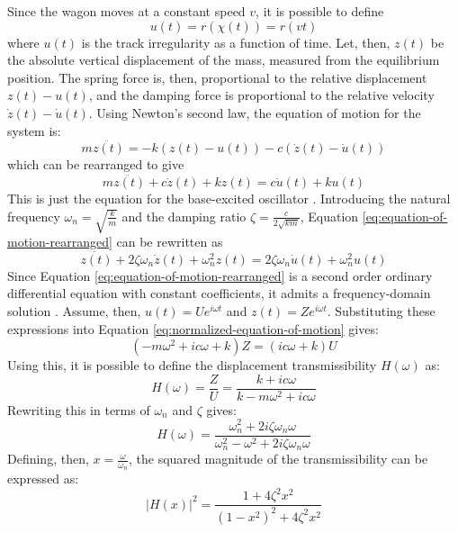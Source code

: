Since the wagon moves at a constant speed $v$, it is possible to define
\begin{equation}
    u(t) = r(\chi (t)) = r(vt)
    \label{eq:spatial-sampling-irregularity}
\end{equation}
where $u(t)$ is the track irregularity as a function of time. Let, then, $z(t)$ be the absolute vertical displacement of the mass, measured from the equilibrium position. The spring force is, then, proportional to the relative displacement $z(t) - u(t)$, and the damping force is proportional to the relative velocity $\dot{z}(t) - \dot{u}(t)$. Using Newton's second law, the equation of motion for the system is:
\begin{equation}
    m \ddot{z (t)} = -k(z(t) - u(t)) - c(\dot{z}(t) - \dot{u}(t))
    \label{eq:equation-of-motion}
\end{equation}
which can be rearranged to give
\begin{equation}
    m \ddot{z (t)} + c \dot{z}(t) + k z(t) = c \dot{u}(t) + k u(t)
    \label{eq:equation-of-motion-rearranged}
\end{equation}
This is just the equation for the base-excited oscillator \cite{newland2005introduction}. Introducing the natural frequency $\omega_n = \sqrt{\frac{k}{m}}$ and the damping ratio $\zeta = \frac{c}{2\sqrt{km}}$, Equation \ref{eq:equation-of-motion-rearranged} can be rewritten as
\begin{equation}
    \ddot{z (t)} + 2 \zeta \omega_n \dot{z}(t) + \omega_n^2 z(t) = 2 \zeta \omega_n \dot{u}(t) + \omega_n^2 u(t)
    \label{eq:normalized-equation-of-motion}
\end{equation}
Since Equation \ref{eq:equation-of-motion-rearranged} is a second order ordinary differential equation with constant coefficients, it admits a frequency-domain solution \cite{peppin1994introduction}. Assume, then, $u(t) = U e^{i \omega t}$ and $z(t) = Z e^{i \omega t}$. Substituting these expressions into Equation \ref{eq:normalized-equation-of-motion} gives:
\begin{equation}
    \left(-m \omega^2 + ic\omega + k\right) Z = \left(ic\omega + k\right)U
\end{equation}
Using this, it is possible to define the displacement transmissibility $H(\omega)$ as:
\begin{equation}
    H(\omega) = \frac{Z}{U} = \frac{k + ic \omega}{k - m\omega^2 + ic \omega}
\end{equation}
Rewriting this in terms of $\omega_n$ and $\zeta$ gives:
\begin{equation}
    H(\omega) = \frac{\omega_n^2 + 2i\zeta \omega_n \omega}{\omega_n^2 - \omega^2 + 2i\zeta \omega_n \omega}
\end{equation}
Defining, then, $x = \frac{\omega}{\omega_n}$, the squared magnitude of the transmissibility can be expressed as:
\begin{equation}
    |H(x)|^2 = \frac{1 + 4 \zeta^2 x^2}{(1 - x^2)^2 + 4 \zeta^2 x^2}
\end{equation}

